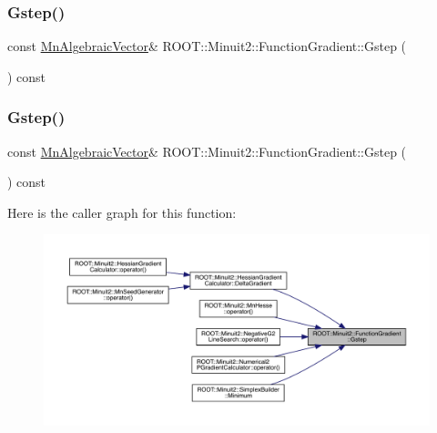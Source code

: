 \subsubsection{\texorpdfstring{Gstep()}{Gstep()}\hspace{0.1cm}{\footnotesize\ttfamily [1/2]}}
{\footnotesize\ttfamily const \mbox{\hyperlink{namespaceROOT_1_1Minuit2_a62ed97730a1ca8d3fbaec64a19aa11c9}{Mn\+Algebraic\+Vector}}\& R\+O\+O\+T\+::\+Minuit2\+::\+Function\+Gradient\+::\+Gstep (\begin{DoxyParamCaption}{ }\end{DoxyParamCaption}) const\hspace{0.3cm}{\ttfamily [inline]}}

\mbox{\label{classROOT_1_1Minuit2_1_1FunctionGradient_a09cf6f34997cef2cffca0d9ccc2b36b8}} 
\subsubsection{\texorpdfstring{Gstep()}{Gstep()}\hspace{0.1cm}{\footnotesize\ttfamily [2/2]}}
{\footnotesize\ttfamily const \mbox{\hyperlink{namespaceROOT_1_1Minuit2_a62ed97730a1ca8d3fbaec64a19aa11c9}{Mn\+Algebraic\+Vector}}\& R\+O\+O\+T\+::\+Minuit2\+::\+Function\+Gradient\+::\+Gstep (\begin{DoxyParamCaption}{ }\end{DoxyParamCaption}) const\hspace{0.3cm}{\ttfamily [inline]}}

Here is the caller graph for this function\+:\nopagebreak
\begin{figure}[H]
\begin{center}
\leavevmode
\includegraphics[width=350pt]{d3/d48/classROOT_1_1Minuit2_1_1FunctionGradient_a09cf6f34997cef2cffca0d9ccc2b36b8_icgraph}
\end{center}
\end{figure}
\mbox{\label{classROOT_1_1Minuit2_1_1FunctionGradient_a34dd6c6a7d699a149edfbb3328c525db}} 
